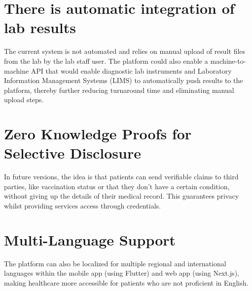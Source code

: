 \documentclass[a4paper,12pt]{report}
\begin{document}
\section{There is automatic integration of lab results}

The current system is not automated and relies on manual upload of result files from the lab by the lab staff user. The platform could also enable a machine-to-machine API that would enable diagnostic lab instruments and Laboratory Information Management Systems (LIMS) to automatically push results to the platform, thereby further reducing turnaround time and eliminating manual upload steps.

\section{Zero Knowledge Proofs for Selective Disclosure}

In future versions, the idea is that patients can send verifiable claims to third parties, like vaccination status or that they don't have a certain condition, without giving up the details of their medical record. This guarantees privacy whilst providing services access through credentials.

\section{Multi-Language Support}

The platform can also be localized for multiple regional and international languages within the mobile app (using Flutter) and web app (using Next.js), making healthcare more accessible for patients who are not proficient in English.

\clearpage
\end{document}
